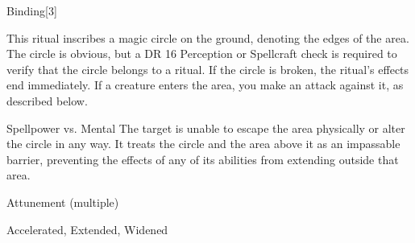 \begin{spellsection}{Binding}[3]
\begin{spellcontent}
\begin{spelltargetinginfo}
\end{spelltargetinginfo}
\begin{spelleffects}
\spelleffect
This ritual inscribes a magic circle on the ground, denoting the edges of the area.
The circle is obvious, but a DR 16 Perception or Spellcraft check is required to verify that the circle belongs to a  ritual.
If the circle is broken, the ritual's effects end immediately.
If a creature enters the area, you make an attack against it, as described below.
\begin{spellattack}{Spellpower vs. Mental}
\spellsuccess
The target is unable to escape the area physically or alter the circle in any way.
It treats the circle and the area above it as an impassable barrier, preventing the effects of any of its abilities from extending outside that area.
\end{spellattack}
\spelldur Attunement (multiple)
\end{spelleffects}
\end{spellcontent}
\begin{spellfooter}
 Accelerated, Extended, Widened
\end{spellfooter}
\begin{spellsubcontent}
\end{spellsubcontent}
\end{spellsection}
